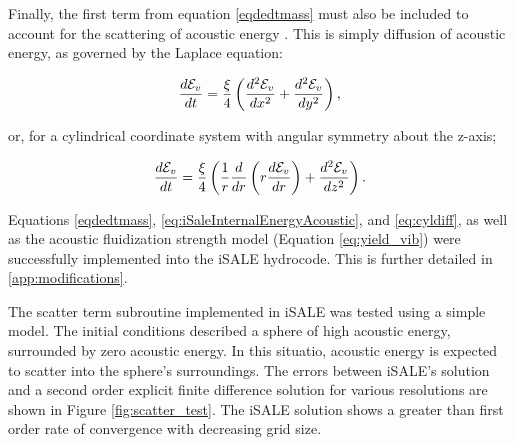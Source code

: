 Finally, the first term from equation \ref{eqdedtmass} must also be included to account for the scattering of acoustic energy \citep{collins2002numerical}. This is simply diffusion of acoustic energy, as governed by the Laplace equation:

\begin{equation} \label{eq:xydiff}
\frac{d \mathcal{E}_{v} }{d t} = \frac{\xi}{4} \left( \frac{d^{2} \mathcal{E}_{v}}{d x^{2}} +\frac{d^{2} \mathcal{E}_{v}}{d y^{2}} \right),\vspace{0.2cm}
\end{equation}

or, for a cylindrical coordinate system with angular symmetry about the z-axis;

\begin{equation} \label{eq:cyldiff}
\frac{d \mathcal{E}_{v} }{d t} = \frac{\xi}{4}  \left( \frac{1}{r} \frac{d}{dr} \left( r \frac{d \mathcal{E}_{v}}{dr} \right) + \frac{d^{2} \mathcal{E}_{v}}{dz^{2}}   \right) .\vspace{0.2cm}
\end{equation} 

Equations \ref{eqdedtmass}, \ref{eq:iSaleInternalEnergyAcoustic}, and \ref{eq:cyldiff}, as well as the acoustic fluidization strength model (Equation \ref{eq:yield_vib}) were successfully implemented into the iSALE hydrocode. This is further detailed in \ref{app:modifications}.

The scatter term subroutine implemented in iSALE was tested using a simple model. The initial conditions described a sphere of high acoustic energy, surrounded by zero acoustic energy. In this situatio, acoustic energy is expected to scatter into the sphere's surroundings. The errors between iSALE's solution and a second order explicit finite difference solution for various resolutions are shown in Figure \ref{fig:scatter_test}. The iSALE solution shows a greater than first order rate of convergence with decreasing grid size.

